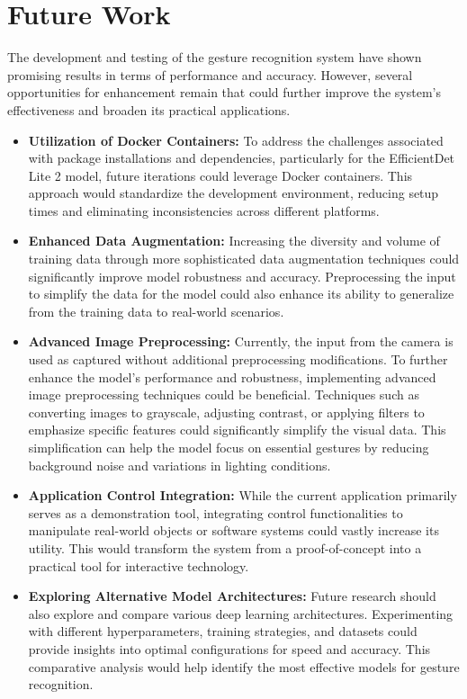 \section{Future Work}

The development and testing of the gesture recognition system have shown promising results in terms of performance and accuracy. However, several opportunities for enhancement remain that could further improve the system's effectiveness and broaden its practical applications.

\begin{itemize}
    \item \textbf{Utilization of Docker Containers:} To address the challenges associated with package installations and dependencies, particularly for the EfficientDet Lite 2 model, future iterations could leverage Docker containers. This approach would standardize the development environment, reducing setup times and eliminating inconsistencies across different platforms.
    
    \item \textbf{Enhanced Data Augmentation:} Increasing the diversity and volume of training data through more sophisticated data augmentation techniques could significantly improve model robustness and accuracy. Preprocessing the input to simplify the data for the model could also enhance its ability to generalize from the training data to real-world scenarios.

    \item \textbf{Advanced Image Preprocessing:} Currently, the input from the camera is used as captured without additional preprocessing modifications. To further enhance the model's performance and robustness, implementing advanced image preprocessing techniques could be beneficial. Techniques such as converting images to grayscale, adjusting contrast, or applying filters to emphasize specific features could significantly simplify the visual data. This simplification can help the model focus on essential gestures by reducing background noise and variations in lighting conditions.
    
    \item \textbf{Application Control Integration:} While the current application primarily serves as a demonstration tool, integrating control functionalities to manipulate real-world objects or software systems could vastly increase its utility. This would transform the system from a proof-of-concept into a practical tool for interactive technology.
    
    \item \textbf{Exploring Alternative Model Architectures:} Future research should also explore and compare various deep learning architectures. Experimenting with different hyperparameters, training strategies, and datasets could provide insights into optimal configurations for speed and accuracy. This comparative analysis would help identify the most effective models for gesture recognition.
\end{itemize}
